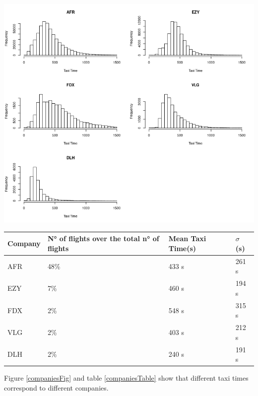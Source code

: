 \documentclass{article}
\begin{document}
\bigskip
\begin{minipage}{\textwidth}
	\begin{minipage}[b]{0.5\textwidth}
		\centering
		\includegraphics[scale=0.3]{companiesTaxiTime.png}
		\label{companiesFig}
	\end{minipage}
\hfill
	\begin{minipage}[b]{0.4\linewidth}
		\centering
		\tiny
		\begin{tabular}{p{0.8cm}p{1.3cm}p{0.8cm}p{0.6cm}}\hline
			Company & N° of flights over the total n° of flights & Mean Taxi Time(s) & $\sigma$ (s)\\ \hline
			AFR & 48\%& 433 s & 261 s\\
			EZY & 7\% & 460 s & 194 s\\
			FDX & 2\% & 548 s & 315 s\\ 
			VLG & 2\% & 403 s & 212 s\\
			DLH & 2\% & 240 s & 191 s\\
			\hline
		\end{tabular}
	\bigskip
	\bigskip
		\label{companiesTable}
	\end{minipage}
\end{minipage}
\bigskip

Figure \ref{companiesFig} and table \ref{companiesTable} show that different taxi times correspond to different companies.  
\end{document}
